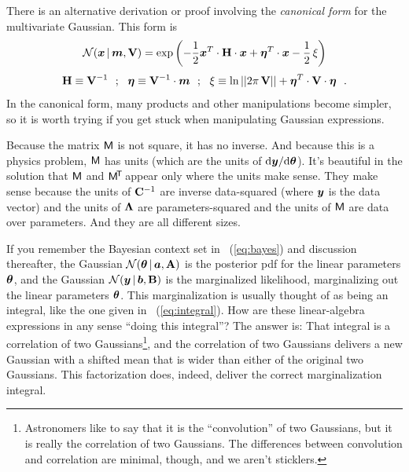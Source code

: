 There is an alternative derivation or proof involving the
\textsl{canonical form} for the multivariate Gaussian. This form is
\begin{equation}
\mathcal{N}\!\,(\boldsymbol{x}\,|\,\boldsymbol{m},\mathbf{V}) = \exp\left(-\frac{1}{2}\boldsymbol{x}^T \cdot\mathbf{H} \cdot \boldsymbol{x} + \boldsymbol{\eta}^T \cdot \boldsymbol{x} - \frac{1}{2}\,\xi\right)
\end{equation}
\begin{equation}
\mathbf{H}\equiv\mathbf{V}^{-1} ~~;~~
\boldsymbol{\eta}\equiv\mathbf{V}^{-1}\cdot\boldsymbol{m} ~~;~~
\xi\equiv\ln||2\pi\,\mathbf{V}||+\boldsymbol{\eta}^T\cdot\mathbf{V}\cdot\boldsymbol{\eta} ~~.
\end{equation}
In the canonical form, many products and other manipulations become
simpler, so it is worth trying if you get stuck when manipulating Gaussian expressions.

Because the matrix $\mathsf{M}$ is not square, it has no inverse. And because this
is a physics problem, $\mathsf{M}$ has units (which are the units of
$\mathrm{d}\boldsymbol{y}/\mathrm{d}\boldsymbol{\theta}$).
It's beautiful in the solution that $\mathsf{M}$ and $\mathsf{M}^{\!\mathsf{T}\!}$ appear only where the
units make sense.
They make sense because the units of $\mathbf{C}^{-1}$ are inverse data-squared (where $\boldsymbol{y}$
is the data vector) and the units of $\mathbf{\Lambda}$ are parameters-squared and the units
of $\mathsf{M}$ are data over parameters.
And they are all different sizes.

If you remember the Bayesian context set in \equationname~(\ref{eq:bayes}) and
discussion thereafter,
the Gaussian $\mathcal{N}\!\,(\boldsymbol{\theta}\,|\,\boldsymbol{a},\mathbf{A})$ is the posterior pdf for the linear
parameters $\boldsymbol{\theta}$, and the Gaussian $\mathcal{N}\!\,(\boldsymbol{y}\,|\,\boldsymbol{b},\mathbf{B})$ is the
marginalized likelihood, marginalizing out the linear parameters $\boldsymbol{\theta}$.
This marginalization is usually thought of as being an integral, like the
one given in \equationname~(\ref{eq:integral}).
How are these linear-algebra expressions in any sense ``doing this integral''?
The answer is: That integral is a correlation of two Gaussians\footnote{Astronomers
  like to say that it is the ``convolution'' of two Gaussians, but it is really the
  correlation of two Gaussians. The differences between convolution and correlation
  are minimal, though, and we aren't sticklers.}, and the correlation of two
Gaussians delivers a new Gaussian with a shifted mean that is wider than either
of the original two Gaussians.
This factorization does, indeed, deliver the correct marginalization integral.

